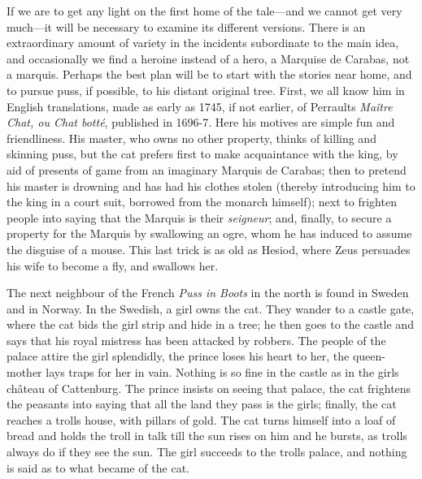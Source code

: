 \documentclass[14pt,a4paper]{memoir}
\begin{document}
{If we are to get any light on the first home of the tale---and we cannot
get very much---it will be necessary to examine its different versions.
There is an extraordinary amount of variety in the incidents subordinate
to the main idea, and occasionally we find a heroine instead of a hero,
a Marquise de Carabas, not a marquis. Perhaps the best plan will be to
start with the stories near home, and to pursue puss, if possible, to
his distant original tree. First, we all know him in English
translations, made as early as 1745, if not earlier, of
Perrault\textquotesingle s \emph{Maître Chat, ou Chat botté}, published
in 1696-7. Here his motives are simple fun and friendliness. His master,
who owns no other property, thinks of killing and skinning puss, but the
cat prefers first to make acquaintance with the king, by aid of presents
of game from an imaginary Marquis de Carabas; then to pretend his master
is drowning and has had his clothes stolen (thereby introducing him to
the king in a court suit, borrowed from the monarch himself); next to
frighten people into saying that the Marquis is their \emph{seigneur};
and, finally, to secure a property for the Marquis by swallowing an
ogre, whom he has induced to assume the disguise of a mouse. This last
trick is as old as
Hesiod,
where Zeus persuades his wife to become a fly, and swallows her.

The next neighbour of the French \emph{Puss in Boots} in the north is
found in
Sweden
and in
Norway.
In the Swedish, a girl owns the cat. They wander to a castle gate, where
the cat bids the girl strip and hide in a tree; he then goes to the
castle and says that his royal mistress has been attacked by robbers.
The people of the palace attire the girl splendidly, the prince loses
his heart to her, the queen-mother lays traps for her in vain. Nothing
is so fine in the castle as in the girl\textquotesingle s château of
Cattenburg. The prince insists on seeing that palace, the cat frightens
the peasants into saying that all the land they pass is the
girl\textquotesingle s; finally, the cat reaches a
troll\textquotesingle s house, with pillars of gold. The cat turns
himself into a loaf of bread and holds the troll in talk till the sun
rises on him and he bursts, as trolls always do if they see the sun. The
girl succeeds to the troll\textquotesingle s palace, and nothing is said
as to what became of the cat.

}
\end{document}
